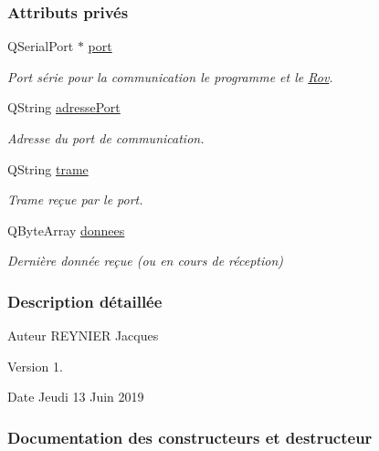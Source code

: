 \subsubsection*{Attributs privés}
\begin{DoxyCompactItemize}
\item 
Q\+Serial\+Port $\ast$ \hyperlink{class_communication_rov_a21b62067ef0b2a6aec339df60b4abd72}{port}
\begin{DoxyCompactList}\small\item\em Port série pour la communication le programme et le \hyperlink{class_rov}{Rov}. \end{DoxyCompactList}\item 
Q\+String \hyperlink{class_communication_rov_a7bd5d36d065005b27ed6cb421c7ffe42}{adresse\+Port}
\begin{DoxyCompactList}\small\item\em Adresse du port de communication. \end{DoxyCompactList}\item 
Q\+String \hyperlink{class_communication_rov_a7100b1be33860d235b45efd9010ac218}{trame}
\begin{DoxyCompactList}\small\item\em Trame reçue par le port. \end{DoxyCompactList}\item 
Q\+Byte\+Array \hyperlink{class_communication_rov_acbb6939bb597179956c6f4bc5ca39f3f}{donnees}
\begin{DoxyCompactList}\small\item\em Dernière donnée reçue (ou en cours de réception) \end{DoxyCompactList}\end{DoxyCompactItemize}


\subsubsection{Description détaillée}
\begin{DoxyAuthor}{Auteur}
R\+E\+Y\+N\+I\+ER Jacques
\end{DoxyAuthor}
\begin{DoxyVersion}{Version}
1.
\end{DoxyVersion}
\begin{DoxyDate}{Date}
Jeudi 13 Juin 2019 
\end{DoxyDate}


\subsubsection{Documentation des constructeurs et destructeur}
\mbox{\label{class_communication_rov_a22b64c69228d392a212f543e071adc02}} 
